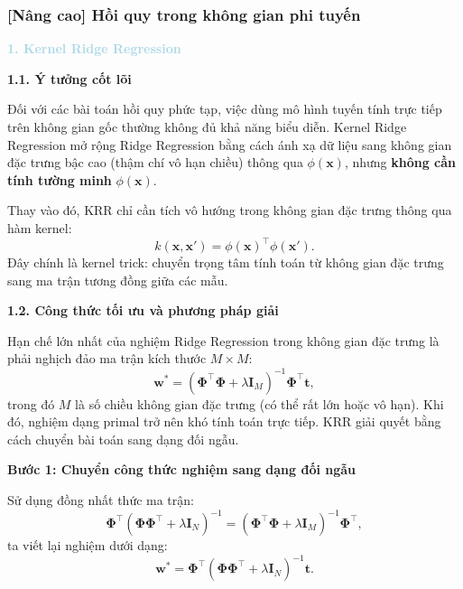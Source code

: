 \subsubsection{[Nâng cao] Hồi quy trong không gian phi tuyến}

\noindent\textcolor{lightblue}{\textbf{1. Kernel Ridge Regression}}
\vspace{0.5em}

\textbf{1.1. Ý tưởng cốt lõi}

Đối với các bài toán hồi quy phức tạp, việc dùng mô hình tuyến tính trực tiếp trên không gian gốc thường không đủ khả năng biểu diễn. Kernel Ridge Regression mở rộng Ridge Regression bằng cách ánh xạ dữ liệu sang không gian đặc trưng bậc cao (thậm chí vô hạn chiều) thông qua $\phi(\mathbf{x})$, nhưng \textbf{không cần tính tường minh} $\phi(\mathbf{x})$.

Thay vào đó, KRR chỉ cần tích vô hướng trong không gian đặc trưng thông qua hàm kernel:
\begin{equation}
    k(\mathbf{x},\mathbf{x}') = \phi(\mathbf{x})^\top\phi(\mathbf{x}').
\end{equation}
Đây chính là kernel trick: chuyển trọng tâm tính toán từ không gian đặc trưng sang ma trận tương đồng giữa các mẫu.

\vspace{0.5em}
\textbf{1.2. Công thức tối ưu và phương pháp giải}

Hạn chế lớn nhất của nghiệm Ridge Regression trong không gian đặc trưng là phải nghịch đảo ma trận kích thước $M\times M$:
\begin{equation}
    \mathbf{w}^*=(\mathbf{\Phi}^\top\mathbf{\Phi}+\lambda\mathbf{I}_M)^{-1}\mathbf{\Phi}^\top\mathbf{t},
\end{equation}
trong đó $M$ là số chiều không gian đặc trưng (có thể rất lớn hoặc vô hạn). Khi đó, nghiệm dạng primal trở nên khó tính toán trực tiếp. KRR giải quyết bằng cách chuyển bài toán sang dạng đối ngẫu.

\textbf{Bước 1: Chuyển công thức nghiệm sang dạng đối ngẫu}

Sử dụng đồng nhất thức ma trận:
\begin{equation}
    \mathbf{\Phi}^\top(\mathbf{\Phi}\mathbf{\Phi}^\top+\lambda\mathbf{I}_N)^{-1}
    =(\mathbf{\Phi}^\top\mathbf{\Phi}+\lambda\mathbf{I}_M)^{-1}\mathbf{\Phi}^\top,
\end{equation}
ta viết lại nghiệm dưới dạng:
\begin{equation}
    \mathbf{w}^*=\mathbf{\Phi}^\top(\mathbf{\Phi}\mathbf{\Phi}^\top+\lambda\mathbf{I}_N)^{-1}\mathbf{t}.
\end{equation}

